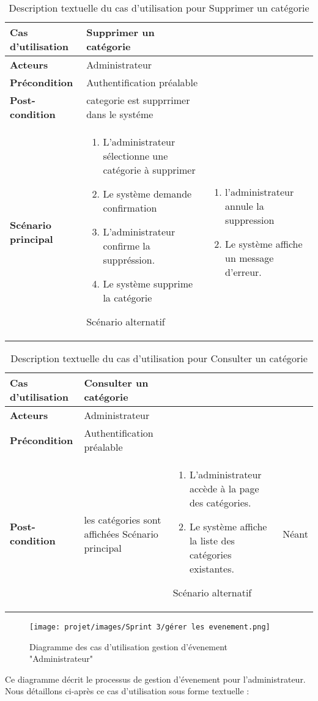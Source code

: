 \begin{longtable}{|>{\bfseries}p{4cm}|p{10cm}|}
\hline
Cas d’utilisation &  Supprimer un catégorie \\
\hline
Acteurs & Administrateur \\
\hline
Précondition & Authentification préalable\\
\hline
Post-condition & categorie est supprrimer dans le systéme\\
\hline
Scénario principal & 
\begin{enumerate}
  \item  L’administrateur sélectionne une catégorie à supprimer
    \item Le système demande confirmation 
  \item   L’administrateur confirme la suppréssion.
  \item  Le système supprime la catégorie

\end{enumerate} 
\hline
Scénario alternatif & 
\begin{enumerate}
    \item l'administrateur annule la suppression 
    \item Le système affiche un message d’erreur.
\end{enumerate}
 \hline
\caption{Description textuelle du cas d’utilisation pour  Supprimer un catégorie }
\end{longtable}



\begin{longtable}{|>{\bfseries}p{4cm}|p{10cm}|}
\hline
Cas d’utilisation &  Consulter un catégorie \\
\hline
Acteurs & Administrateur \\
\hline
Précondition & Authentification préalable\\
\hline
Post-condition & les catégories sont affichées
\hline
Scénario principal & 
\begin{enumerate}
  \item L’administrateur accède à la page des catégories.
    \item Le système affiche la liste des catégories existantes.  
\end{enumerate} 
\hline
Scénario alternatif & Néant

 \hline
\caption{Description textuelle du cas d’utilisation pour   Consulter un catégorie }
\end{longtable}
\begin{figure}[H]
    \centering
    \texttt{[image: projet/images/Sprint 3/gérer les evenement.png]}
    \caption{Diagramme des cas d’utilisation gestion d'évenement "Administrateur" }
    \label{fig:Adminee }
\end{figure}
Ce diagramme décrit le processus de gestion d'évenement pour l'administrateur. Nous détaillons ci-après ce cas d’utilisation sous forme textuelle :


